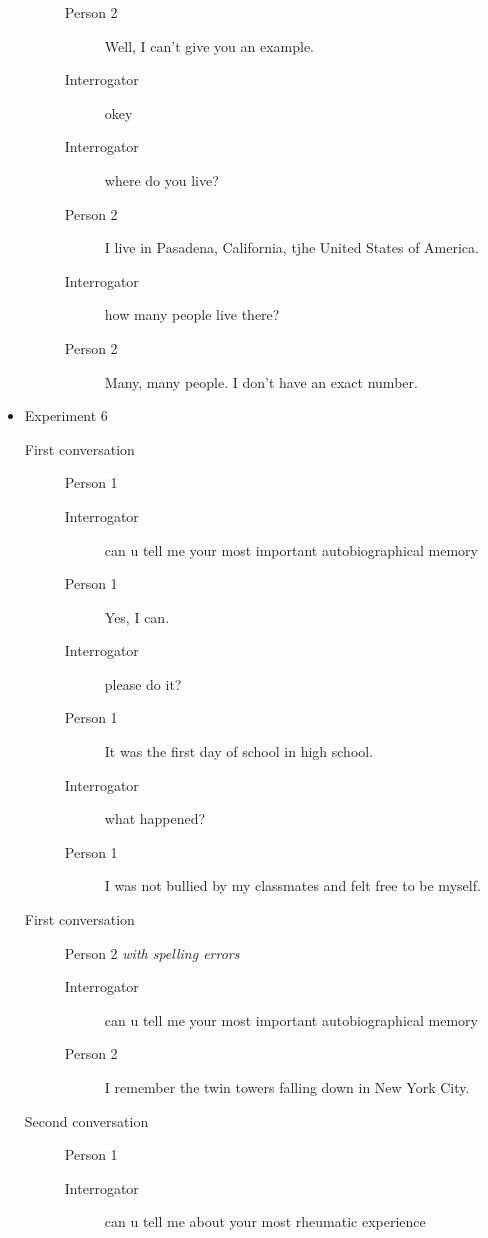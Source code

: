 \begin{itemize}
\begin{description}
\begin{description}
               \item [Person 2] Well, I can't give you an example.
               \item [Interrogator] okey
               \item [Interrogator] where do you live?
               \item [Person 2] I live in Pasadena, California, tjhe United States of America.
               \item [Interrogator] how many people live there?
               \item [Person 2] Many, many people. I don't have an exact number.
            \end{description}
      \end{description}

   \item Experiment 6
      \begin{description}
         \item [First conversation] Person 1
            \begin{description}
               \item [Interrogator] can u tell me your most important autobiographical memory
               \item [Person 1] Yes, I can.
               \item [Interrogator] please do it?
               \item [Person 1] It was the first day of school in high school.
               \item [Interrogator] what happened?
               \item [Person 1] I was not bullied by my classmates and felt free to be myself.
            \end{description}
         \item [First conversation] Person 2 \textit{with spelling errors}
            \begin{description}
               \item [Interrogator] can u tell me your most important autobiographical memory
               \item [Person 2] I remember the twin towers falling down in New York City.
            \end{description}
         \item [Second conversation] Person 1
            \begin{description}
               \item [Interrogator] can u tell me about your most rheumatic experience

\end{description}
\end{description}
\end{itemize}
